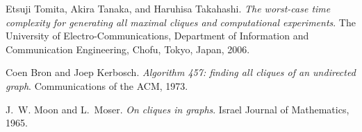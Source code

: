 \documentclass{article}
\begin{document}
\newpage

\begin{thebibliography}{9}

Etsuji Tomita, Akira Tanaka, and Haruhisa Takahashi.  
\textit{The worst-case time complexity for generating all maximal cliques and computational experiments}.  
The University of Electro-Communications, Department of Information and Communication Engineering, Chofu, Tokyo, Japan, 2006.

Coen Bron and Joep Kerbosch.  
\textit{Algorithm 457: finding all cliques of an undirected graph}.  
Communications of the ACM, 1973.

J.~W. Moon and L.~Moser.  
\textit{On cliques in graphs}.  
Israel Journal of Mathematics, 1965.

\end{thebibliography}
\end{document}
